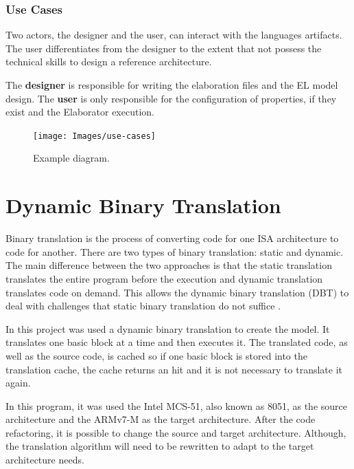 \documentclass{report}
\begin{document}
			\subsubsection{Use Cases}
			
			\par Two actors, the designer and the user, can interact with the languages artifacts. The user differentiates
			from the designer to the extent that not possess the technical skills to design a reference architecture.
			\par The \textbf{designer} is responsible for writing the elaboration files and the EL model design. The \textbf{user} is only responsible for the configuration of properties, if they exist and the Elaborator execution.
			
			\begin{figure} [!h]
				\centering
				\texttt{[image: Images/use-cases]}
				\caption{Example diagram.}
				\label{fig:use-cases}
			\end{figure}			
			

	\section{Dynamic Binary Translation}
	\par Binary translation is the process of converting code for one ISA architecture to code for another. There are two types of binary translation: static and dynamic. The main difference between the two approaches is that the static translation translates the entire program before the execution and dynamic translation translates code on demand. This allows the dynamic binary translation (DBT) to deal with challenges that static binary translation do not suffice \cite{b.hawkingsb.demskyd.brueningq.zhao2015}. 
	\par In this project was used a dynamic binary translation to create the model. It translates one basic block at a time and then executes it. The translated code, as well as the source code, is cached so if one basic block is stored into the translation cache, the cache returns an hit and it is not necessary to translate it again. 
	\par In this program, it was used the Intel MCS-51, also known as 8051, as the source architecture and the ARMv7-M as the target architecture. After the code refactoring, it is possible to change the source and target architecture. Although, the translation algorithm will need to be rewritten to adapt to the target architecture needs.
	
\end{document}
